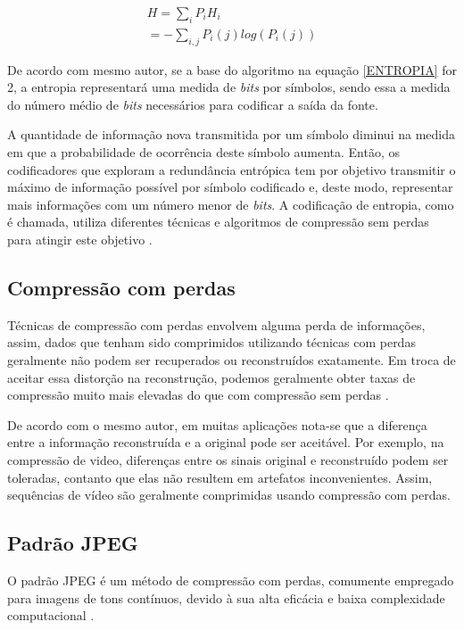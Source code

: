 \begin{equation}
\label{ENTROPIA}
	\begin{split}
		H = \sum_i P_iH_i\\
		= - \sum_{i,j} P_i(j) log(P_i(j))
	\end{split}
\end{equation}

De acordo com mesmo autor, se a base do algoritmo na equação \ref{ENTROPIA} for 2, a entropia representará uma medida de \textit{bits} por símbolos, sendo essa a medida do número médio de \textit{bits} necessários para codificar a saída da fonte. 

A quantidade de informação nova transmitida por um símbolo diminui na medida em que a probabilidade de ocorrência deste símbolo aumenta. Então, os codificadores que exploram a redundância entrópica tem por objetivo transmitir o máximo de informação possível por símbolo codificado e, deste modo, representar
mais informações com um número menor de \textit{bits}. A codificação de entropia, como é chamada, utiliza diferentes técnicas e algoritmos de compressão sem perdas para atingir este objetivo \cite{da2007estudo}.

\subsection{Compressão com perdas}

Técnicas de compressão com perdas envolvem alguma perda de informações, assim, dados que tenham sido comprimidos utilizando técnicas com perdas geralmente não podem ser recuperados ou reconstruídos exatamente. Em troca de aceitar essa distorção na reconstrução, podemos geralmente obter taxas de compressão muito mais elevadas do que com compressão sem perdas  \cite{sayood2012introduction}.

De acordo com o mesmo autor, em muitas aplicações nota-se que a diferença entre a informação reconstruída e a original pode ser aceitável. Por exemplo, na compressão de video, diferenças entre os sinais original e reconstruído podem ser toleradas, contanto que elas não resultem em artefatos inconvenientes. Assim, sequências de vídeo são geralmente comprimidas usando compressão com perdas.

\subsection{Padrão JPEG} \label{JPEG}
 O padrão JPEG é um método de compressão com perdas, comumente empregado para imagens de tons contínuos, devido à sua alta eficácia e baixa complexidade computacional \cite{wang2008jpeg}.
 
